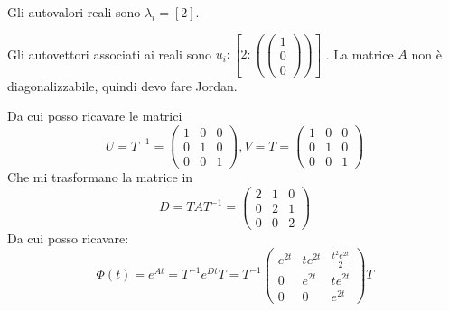 \documentclass{article}
\begin{document}
Gli autovalori reali sono $\lambda_i = [2]$.

Gli autovettori associati ai reali sono $ u_i: [  2: (\left(\begin{matrix}1\\0\\0\end{matrix}\right)) ]$
.
La matrice $A$ non è diagonalizzabile, quindi devo fare Jordan.

Da cui posso ricavare le matrici \[U=T^{-1} = \left(\begin{matrix}1 & 0 & 0\\0 & 1 & 0\\0 & 0 & 1\end{matrix}\right), V = T = \left(\begin{matrix}1 & 0 & 0\\0 & 1 & 0\\0 & 0 & 1\end{matrix}\right)\]
Che mi trasformano la matrice in \[ D = TAT^{-1} = \left(\begin{matrix}2 & 1 & 0\\0 & 2 & 1\\0 & 0 & 2\end{matrix}\right) \]
Da cui posso ricavare: \[ \Phi(t) = e^{At} = T^{-1} e^{Dt} T =  T^{-1} \left(\begin{matrix}e^{2 t} & t e^{2 t} & \frac{t^{2} e^{2 t}}{2}\\0 & e^{2 t} & t e^{2 t}\\0 & 0 & e^{2 t}\end{matrix}\right) T\]
\end{document}
